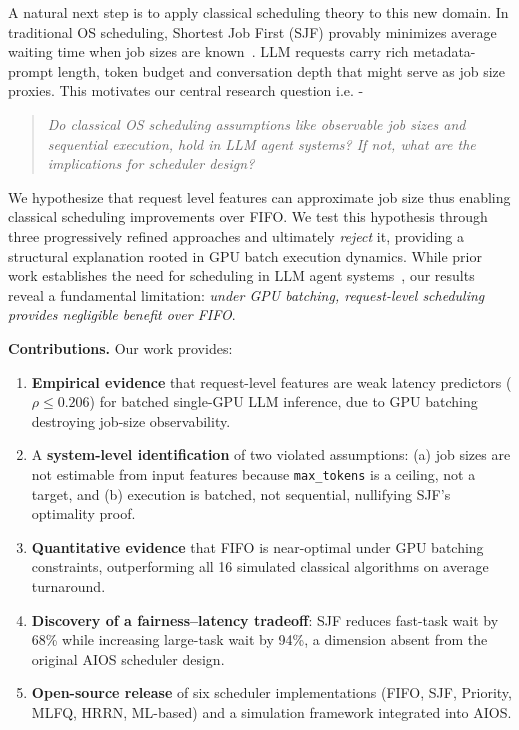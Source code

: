 \documentclass[conference]{IEEEtran}
\begin{document}
A natural next step is to apply classical scheduling theory to this new domain. In traditional OS scheduling, Shortest Job First (SJF) provably minimizes average waiting time when job sizes are known~\cite{silberschatz2018os}. LLM requests carry rich metadata-prompt length, token budget and conversation depth that might serve as job size proxies. This motivates our central research question i.e. -

\begin{quote}
\textit{Do classical OS scheduling assumptions like observable job sizes and sequential execution, hold in LLM agent systems? If not, what are the implications for scheduler design?}
\end{quote}

We hypothesize that request level features can approximate job size thus enabling classical scheduling improvements over FIFO. We test this hypothesis through three progressively refined approaches and ultimately \textit{reject} it, providing a structural explanation rooted in GPU batch execution dynamics. While prior work establishes the need for scheduling in LLM agent systems~\cite{mei2025aios}, our results reveal a fundamental limitation: \textit{under GPU batching, request-level scheduling provides negligible benefit over FIFO}.

\smallskip
\noindent\textbf{Contributions.} Our work provides:

\begin{enumerate}
    \item \textbf{Empirical evidence} that request-level features are weak latency predictors ($\rho \leq 0.206$) for batched single-GPU LLM inference, due to GPU batching destroying job-size observability.
    \item A \textbf{system-level identification} of two violated assumptions: (a) job sizes are not estimable from input features because \texttt{max\_tokens} is a ceiling, not a target, and (b) execution is batched, not sequential, nullifying SJF's optimality proof.
    \item \textbf{Quantitative evidence} that FIFO is near-optimal under GPU batching constraints, outperforming all 16 simulated classical algorithms on average turnaround.
    \item \textbf{Discovery of a fairness--latency tradeoff}: SJF reduces fast-task wait by 68\% while increasing large-task wait by 94\%, a dimension absent from the original AIOS scheduler design.
    \item \textbf{Open-source release} of six scheduler implementations (FIFO, SJF, Priority, MLFQ, HRRN, ML-based) and a simulation framework integrated into AIOS.
\end{enumerate}
\end{document}
